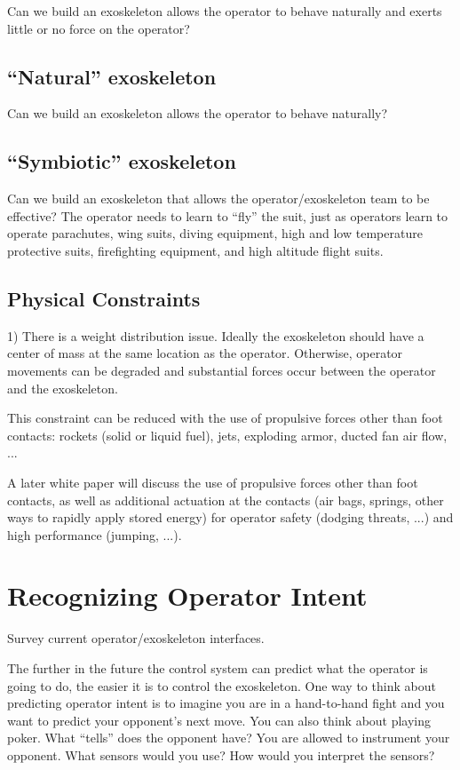 \documentclass[letterpaper,12pt,fullpage]{article}
\begin{document}
Can we build an exoskeleton allows the operator to behave naturally
and exerts little or no force on the operator?

\subsection{``Natural'' exoskeleton}

Can we build an exoskeleton allows the operator to behave naturally?

\subsection{``Symbiotic'' exoskeleton}

Can we build an exoskeleton that allows the operator/exoskeleton team
to be effective? The operator needs to learn to ``fly'' the suit,
just as operators learn to operate parachutes,
wing suits, diving equipment, high and low temperature protective
suits, firefighting equipment, and high altitude flight suits.

\subsection{Physical Constraints}

1) There is a weight distribution issue. Ideally the exoskeleton should
have a center of mass at the same location as the operator. Otherwise,
operator movements can be degraded and substantial forces occur between
the operator and the exoskeleton.

This constraint can be reduced with the use of propulsive forces other
than foot contacts: rockets (solid or liquid fuel), jets, exploding armor,
ducted fan air flow, ...

A later white paper will discuss the use of propulsive forces other
than foot contacts, as well as additional actuation at the contacts (air
bags, springs, other ways to rapidly apply stored energy) for
operator safety (dodging threats, ...) and high performance (jumping, ...).

\section{Recognizing Operator Intent}

Survey current operator/exoskeleton interfaces.

The further in the future the control system can predict what the operator
is going to do, the easier it is to control the exoskeleton. One way
to think about predicting operator intent is to imagine you are in
a hand-to-hand fight and you want to predict your opponent's next move.
You can also think about playing poker. What ``tells'' does the opponent
have?
You are allowed to instrument your opponent. What sensors would you use?
How would you interpret the sensors?
\end{document}
